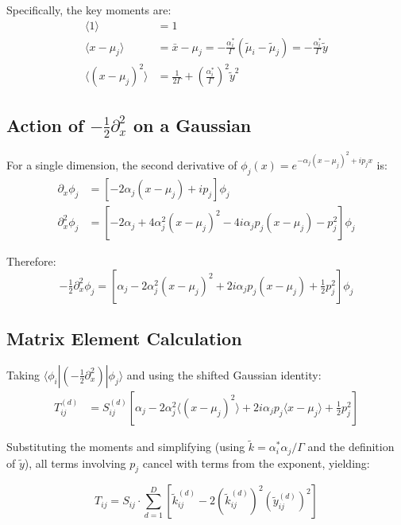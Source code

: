 \documentclass[11pt,a4paper]{article}
\newcommand{\half}{\tfrac{1}{2}}
\theoremstyle{definition}
\begin{document}
Specifically, the key moments are:
\begin{align}
\langle 1 \rangle &= 1 \\
\langle x - \mu_j \rangle &= \bar{x} - \mu_j = -\frac{\alpha_i^*}{\Gamma}(\tilde{\mu}_i - \tilde{\mu}_j) = -\frac{\alpha_i^*}{\Gamma} \tilde{y} \\
\langle (x - \mu_j)^2 \rangle &= \frac{1}{2\Gamma} + \left(\frac{\alpha_i^*}{\Gamma}\right)^2 \tilde{y}^2
\end{align}

\subsection{Action of $-\half\partial_x^2$ on a Gaussian}

For a single dimension, the second derivative of $\phi_j(x) = e^{-\alpha_j(x-\mu_j)^2 + ip_j x}$ is:
\begin{align}
\partial_x \phi_j &= \left[ -2\alpha_j(x - \mu_j) + ip_j \right] \phi_j \\
\partial_x^2 \phi_j &= \left[ -2\alpha_j + 4\alpha_j^2(x-\mu_j)^2 - 4i\alpha_j p_j(x-\mu_j) - p_j^2 \right] \phi_j
\end{align}

Therefore:
\begin{equation}
-\half \partial_x^2 \phi_j = \left[ \alpha_j - 2\alpha_j^2(x-\mu_j)^2 + 2i\alpha_j p_j(x-\mu_j) + \half p_j^2 \right] \phi_j
\end{equation}

\subsection{Matrix Element Calculation}

Taking $\langle \phi_i | (-\half\partial_x^2) | \phi_j \rangle$ and using the shifted Gaussian identity:
\begin{align}
T^{(d)}_{ij} &= S^{(d)}_{ij} \left[ \alpha_j - 2\alpha_j^2 \langle(x-\mu_j)^2\rangle + 2i\alpha_j p_j \langle x-\mu_j\rangle + \half p_j^2 \right]
\end{align}

Substituting the moments and simplifying (using $\tilde{k} = \alpha_i^* \alpha_j / \Gamma$ and the definition of $\tilde{y}$), all terms involving $p_j$ cancel with terms from the exponent, yielding:

\begin{tcolorbox}[colback=green!5,colframe=green!50!black,title=Kinetic Matrix $T$]
\begin{equation}
T_{ij} = S_{ij} \cdot \sum_{d=1}^{D} \left[ \tilde{k}_{ij}^{(d)} - 2 (\tilde{k}_{ij}^{(d)})^2 (\tilde{y}_{ij}^{(d)})^2 \right]
\end{equation}
\end{tcolorbox}
\end{document}
